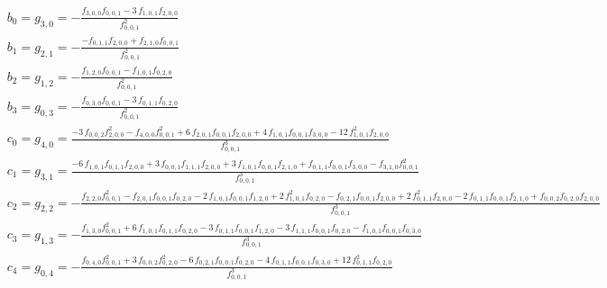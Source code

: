 \begin{eqnarray*}
&b_0=g_{3,0}=-{\frac { f_{3,0,0} f_{0,0,1} -3\, f_{1,0,1} f_{2,0,0} }{
f_{0,0,1} ^{2}}}
\\
&b_1=g_{2,1}=-{\frac {-  f_{0,1,1}      f_{2,0,0}    +  f_{2,1,0}    f_{0,0,1}  }{  f_{0,0,1}    ^{2}}}
\\
&b_2=g_{1,2}=-{\frac {  f_{1,2,0}    f_{0,0,1}  -  f_{1,0,1}      f_{0,2,0}    }{  f_{0,0,1}    ^{2}}}
\\
&b_3=g_{0,3}=-{\frac {  f_{0,3,0}    f_{0,0,1}  -3\,  f_{0,1,1}      f_{0,2,0}    }{  f_{0,0,1}    ^{2}}}
\\
&c_0=g_{4,0}={\frac {-3\,  f_{0,0,2}        f_{2,0,0}      ^{2}-  f_{4,0,0}      f_{0,0,1}    ^{2}+6\,  f_{2,0,1}    f_{0,0,1}    f_{2,0,0}    +4\,  f_{1,0,1}    f_{0,0,1}    f_{3,0,0}    -12\,    f_{1,0,1}      ^{2}  f_{2,0,0}    }{  f_{0,0,1}    ^{3}}}
\\
&c_1=g_{3,1}={\frac {-6\,  f_{1,0,1}      f_{0,1,1}      f_{2,0,0}    +3\,f_{0,0,1}    f_{1,1,1}      f_{2,0,0}    +3\,  f_{1,0,1}    f_{0,0,1}    f_{2,1,0}    +  f_{0,1,1}    f_{0,0,1}    f_{3,0,0}    -  f_{3,1,0}      f_{0,0,1}    ^{2}}{  f_{0,0,1}    ^{3}}}
\\
&c_2=g_{2,2}=-{\frac {  f_{2,2,0}      f_{0,0,1}    ^{2}-  f_{2,0,1}   f_{0,0,1}    f_{0,2,0}    -2\,  f_{1,0,1}    f_{0,0,1}    f_{1,2,0}    +2\,    f_{1,0,1}      ^{2}  f_{0,2,0}    -  f_{0,2,1}    f_{0,0,1}    f_{2,0,0}    +2\,    f_{0,1,1}      ^{2}  f_{2,0,0}    -2\,  f_{0,1,1}    f_{0,0,1}    f_{2,1,0}    +  f_{0,0,2}      f_{0,2,0}      f_{2,0,0}    }{  f_{0,0,1}    ^{3}}}
\\
&c_3=g_{1,3}=-{\frac {  f_{1,3,0}      f_{0,0,1}    ^{2}+6\,  f_{1,0,1}      f_{0,1,1}      f_{0,2,0}    -3\,  f_{0,1,1}    f_{0,0,1}    f_{1,2,0}    -3\,  f_{1,1,1}    f_{0,0,1}    f_{0,2,0}    -  f_{1,0,1}    f_{0,0,1}    f_{0,3,0}    }{  f_{0,0,1}    ^{3}}}
\\
&c_4=g_{0,4}=-{\frac {  f_{0,4,0}     f_{0,0,1}    ^{2}+3\,  f_{0,0,2}        f_{0,2,0}      ^{2}-6\,  f_{0,2,1}    f_{0,0,1}    f_{0,2,0}    -4\,  f_{0,1,1}    f_{0,0,1}    f_{0,3,0}    +12\,    f_{0,1,1}      ^{2}  f_{0,2,0}    }{  f_{0,0,1}    ^{3}}}
\end{eqnarray*} 
